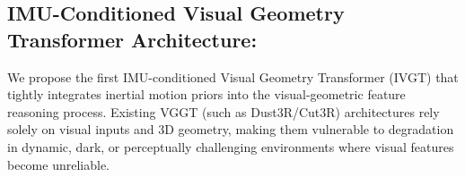



\subsection{IMU-Conditioned Visual Geometry Transformer Architecture:}
We propose the first IMU-conditioned Visual Geometry Transformer (IVGT) that tightly integrates inertial motion priors into the visual-geometric feature reasoning process. Existing VGGT (such as Dust3R/Cut3R) architectures rely solely on visual inputs and 3D geometry, making them vulnerable to degradation in dynamic, dark, or perceptually challenging environments where visual features become unreliable. 

